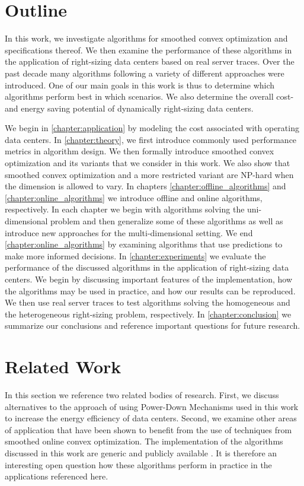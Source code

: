 \section{Outline}

In this work, we investigate algorithms for smoothed convex optimization and specifications thereof. We then examine the performance of these algorithms in the application of right-sizing data centers based on real server traces. Over the past decade many algorithms following a variety of different approaches were introduced. One of our main goals in this work is thus to determine which algorithms perform best in which scenarios. We also determine the overall cost- and energy saving potential of dynamically right-sizing data centers.

We begin in \autoref{chapter:application} by modeling the cost associated with operating data centers. In \autoref{chapter:theory}, we first introduce commonly used performance metrics in algorithm design. We then formally introduce smoothed convex optimization and its variants that we consider in this work. We also show that smoothed convex optimization and a more restricted variant are NP-hard when the dimension is allowed to vary. In chapters \ref{chapter:offline_algorithms} and \ref{chapter:online_algorithms} we introduce offline and online algorithms, respectively. In each chapter we begin with algorithms solving the uni-dimensional problem and then generalize some of these algorithms as well as introduce new approaches for the multi-dimensional setting. We end \autoref{chapter:online_algorithms} by examining algorithms that use predictions to make more informed decisions. In \autoref{chapter:experiments} we evaluate the performance of the discussed algorithms in the application of right-sizing data centers. We begin by discussing important features of the implementation, how the algorithms may be used in practice, and how our results can be reproduced. We then use real server traces to test algorithms solving the homogeneous and the heterogeneous right-sizing problem, respectively. In \autoref{chapter:conclusion} we summarize our conclusions and reference important questions for future research.

\section{Related Work}

In this section we reference two related bodies of research. First, we discuss alternatives to the approach of using Power-Down Mechanisms used in this work to increase the energy efficiency of data centers. Second, we examine other areas of application that have been shown to benefit from the use of techniques from smoothed online convex optimization. The implementation of the algorithms discussed in this work are generic and publicly available \cite{Hübotter2021}. It is therefore an interesting open question how these algorithms perform in practice in the applications referenced here.

